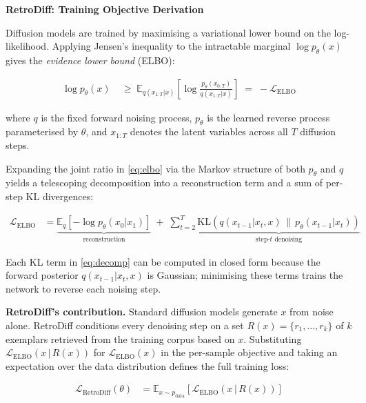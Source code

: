 \documentclass[11pt]{article}
\begin{document}
\begin{center}
  {\large\bfseries\color{accentblue} RetroDiff: Training Objective Derivation}
\end{center}

\medskip
\noindent
Diffusion models are trained by maximising a variational lower bound on the log-likelihood.
Applying Jensen's inequality to the intractable marginal $\log p_\theta(x)$ gives the
\emph{evidence lower bound} (ELBO):

\begin{align}
  \log p_\theta(x)
    &\;\geq\;
    \mathbb{E}_{q(x_{1:T}|x)}\!\left[
      \log\frac{p_\theta(x_{0:T})}{q(x_{1:T}|x)}
    \right]
    \;=\; -\mathcal{L}_{\mathrm{ELBO}}
  \label{eq:elbo}
\end{align}

\noindent
where $q$ is the fixed forward noising process,
$p_\theta$ is the learned reverse process parameterised by $\theta$,
and $x_{1:T}$ denotes the latent variables across all $T$ diffusion steps.

\medskip
\noindent
Expanding the joint ratio in \eqref{eq:elbo} via the Markov structure of both
$p_\theta$ and $q$ yields a telescoping decomposition into a reconstruction term
and a sum of per-step KL divergences:

\begin{align}
  \mathcal{L}_{\mathrm{ELBO}}
    &= \underbrace{\mathbb{E}_q[-\log p_\theta(x_0|x_1)]}_{\text{reconstruction}}
    \;+\;
    \sum_{t=2}^{T}
    \underbrace{
      \mathrm{KL}\!\left(
        q(x_{t-1}|x_t, x) \,\|\, p_\theta(x_{t-1}|x_t)
      \right)
    }_{\text{step-}t\text{ denoising}}
  \label{eq:decomp}
\end{align}

\noindent
Each KL term in \eqref{eq:decomp} can be computed in closed form because the
forward posterior $q(x_{t-1}|x_t, x)$ is Gaussian; minimising these terms trains
the network to reverse each noising step.

\medskip
\noindent
\textbf{RetroDiff's contribution.}
Standard diffusion models generate $x$ from noise alone.
RetroDiff conditions every denoising step on a set
$R(x)=\{r_1,\ldots,r_k\}$ of $k$ exemplars retrieved from the training corpus
based on $x$.
Substituting $\mathcal{L}_{\mathrm{ELBO}}(x\,|\,R(x))$
for $\mathcal{L}_{\mathrm{ELBO}}(x)$ in the per-sample objective and taking an
expectation over the data distribution defines the full training loss:

\begin{align}
  \mathcal{L}_{\mathrm{RetroDiff}}(\theta)
    &= \mathbb{E}_{x \sim p_{\mathrm{data}}}\!\left[
        \mathcal{L}_{\mathrm{ELBO}}\!\left(x \,\big|\, R(x)\right)
      \right]
  \label{eq:retro}
\end{align}
\end{document}
